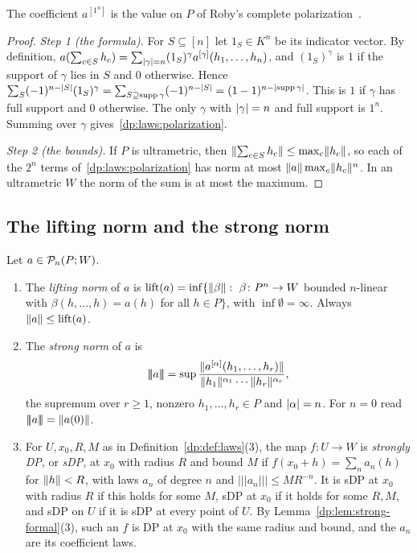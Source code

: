 The coefficient $a^{[1^n]}$ is the value on $P$ of Roby's complete polarization~\cite[II~\S1]{Ro}.

\begin{proof}
\emph{Step 1 (the formula).} For $S\subseteq[n]$ let $1_S\in K^n$ be its indicator vector. By definition, $a(\sum_{c\in S}h_c)=\sum_{\lvert \gamma\rvert=n}(1_S)^\gamma a^{[\gamma]}(h_1,\dots,h_n)$, and $(1_S)^\gamma$ is $1$ if the support of $\gamma$ lies in $S$ and $0$ otherwise. Hence $\sum_S(-1)^{n-\lvert S\rvert}(1_S)^\gamma=\sum_{S\supseteq\operatorname{supp}\gamma}(-1)^{n-\lvert S\rvert}=(1-1)^{n-\lvert \operatorname{supp}\gamma\rvert}$. This is $1$ if $\gamma$ has full support and $0$ otherwise. The only $\gamma$ with $\lvert \gamma\rvert=n$ and full support is $1^n$. Summing over $\gamma$ gives~\eqref{dp:laws:polarization}.

\emph{Step 2 (the bounds).} If $P$ is ultrametric, then $\lVert \sum_{c\in S}h_c\rVert\le\max_c\lVert h_c\rVert$, so each of the $2^n$ terms of~\eqref{dp:laws:polarization} has norm at most $\lVert a\rVert\max_c\lVert h_c\rVert^n$. In an ultrametric $W$ the norm of the sum is at most the maximum.
\end{proof}

\subsection{The lifting norm and the strong norm}

\begin{definition}\label{dp:def:strong-norm}
Let $a\in\mathcal P_n(P;W)$.
\begin{enumerate}
\item The \emph{lifting norm} of $a$ is $\operatorname{lift}(a)=\inf\{\norm\beta:\ \beta\colon P^n\to W$ bounded $n$\nobreakdash-linear with $\beta(h,\dots,h)=a(h)$ for all $h\in P\}$, with $\inf\emptyset=\infty$. Always $\lVert a\rVert\le\operatorname{lift}(a)$.
\item The \emph{strong norm} of $a$ is
\[
 \lvert\!\lvert\!\lvert a\rvert\!\rvert\!\rvert=\sup\frac{\lVert a^{[\alpha]}(h_1,\dots,h_r)\rVert}{\lVert h_1\rVert^{\alpha_1}\cdots\lVert h_r\rVert^{\alpha_r}},
\]
the supremum over $r\ge1$, nonzero $h_1,\dots,h_r\in P$ and $\lvert \alpha\rvert=n$. For $n=0$ read $\lvert\!\lvert\!\lvert a\rvert\!\rvert\!\rvert=\lVert a(0)\rVert$.
\item For $U,x_0,R,M$ as in Definition~\ref{dp:def:laws}(3), the map $f\colon U\to W$ is \emph{strongly DP}, or \emph{sDP}, at $x_0$ with radius $R$ and bound $M$ if $f(x_0+h)=\sum_na_n(h)$ for $\lVert h\rVert<R$, with laws $a_n$ of degree $n$ and $\lvert\!\lvert\!\lvert a_n\rvert\!\rvert\!\rvert\le MR^{-n}$. It is sDP at $x_0$ with radius $R$ if this holds for some $M$, sDP at $x_0$ if it holds for some $R,M$, and sDP on $U$ if it is sDP at every point of $U$. By Lemma~\ref{dp:lem:strong-formal}(3), such an $f$ is DP at $x_0$ with the same radius and bound, and the $a_n$ are its coefficient laws.
\end{enumerate}
\end{definition}

